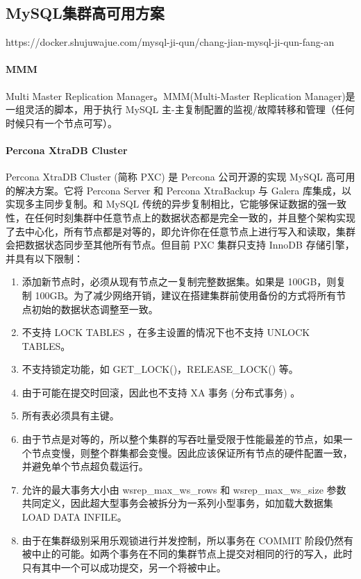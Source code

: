 \documentclass[../../../interview-questions.tex]{subfiles}
\begin{document}
\subsection{MySQL集群高可用方案}

https://docker.shujuwajue.com/mysql-ji-qun/chang-jian-mysql-ji-qun-fang-an

\paragraph{MMM}

Multi Master Replication Manager。MMM(Multi-Master Replication Manager)是一组灵活的脚本，用于执行 MySQL 主-主复制配置的监视/故障转移和管理（任何时候只有一个节点可写）。

\paragraph{Percona XtraDB Cluster }

Percona XtraDB Cluster (简称 PXC) 是 Percona 公司开源的实现 MySQL 高可用的解决方案。它将 Percona Server 和 Percona XtraBackup 与 Galera 库集成，以实现多主同步复制。和 MySQL 传统的异步复制相比，它能够保证数据的强一致性，在任何时刻集群中任意节点上的数据状态都是完全一致的，并且整个架构实现了去中心化，所有节点都是对等的，即允许你在任意节点上进行写入和读取，集群会把数据状态同步至其他所有节点。但目前 PXC 集群只支持 InnoDB 存储引擎，并具有以下限制：

\begin{enumerate}
    \item {添加新节点时，必须从现有节点之一复制完整数据集。如果是 100GB，则复制 100GB。为了减少网络开销，建议在搭建集群前使用备份的方式将所有节点初始的数据状态调整至一致。}
    \item {不支持 LOCK TABLES ，在多主设置的情况下也不支持 UNLOCK TABLES。}
    \item {不支持锁定功能，如 GET\_LOCK()，RELEASE\_LOCK() 等。}
    \item {由于可能在提交时回滚，因此也不支持 XA 事务 (分布式事务) 。}
    \item {所有表必须具有主键。}
    \item {由于节点是对等的，所以整个集群的写吞吐量受限于性能最差的节点，如果一个节点变慢，则整个群集都会变慢。因此应该保证所有节点的硬件配置一致，并避免单个节点超负载运行。}
    \item {允许的最大事务大小由 wsrep\_max\_ws\_rows 和 wsrep\_max\_ws\_size 参数共同定义，因此超大型事务会被拆分为一系列小型事务，如加载大数据集 LOAD DATA INFILE。}
    \item {由于在集群级别采用乐观锁进行并发控制，所以事务在 COMMIT 阶段仍然有被中止的可能。如两个事务在不同的集群节点上提交对相同的行的写入，此时只有其中一个可以成功提交，另一个将被中止。}
\end{enumerate}
\end{document}
